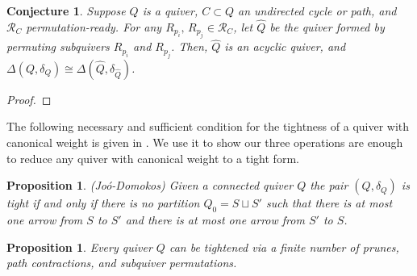 \documentclass[12pt]{amsart}
\theoremstyle{plain}
\newtheorem{conjecture}[theorem]{Conjecture}
\newtheorem{proposition}[theorem]{Proposition}
\theoremstyle{definition}
\begin{document}
\begin{conjecture}
    Suppose $Q$ is a quiver, $C \subset Q$ an undirected cycle or path, and $\mathcal{R}_C$ permutation-ready. For any $R_{p_i},\,R_{p_j} \in \mathcal{R}_C$, let $\hat Q$ be the quiver formed by permuting subquivers $R_{p_i}$ and $R_{p_j}$. Then, $\hat Q$ is an acyclic quiver, and $\Delta(Q, \delta_Q) \cong \Delta(\hat Q, \delta_{\hat Q})$.
\end{conjecture}

\begin{proof}
    
\end{proof}

The following necessary and sufficient condition for the tightness of a quiver with canonical weight is given in \cite{domokos2016equations}. We use it to show our three operations are enough to reduce any quiver with canonical weight to a tight form.

\begin{proposition}\label{canonical-contraction-condition}
    (Joó-Domokos) Given a connected quiver $Q$ the pair $(Q, \delta_Q)$ is tight if and only if there is no partition $Q_0 = S \sqcup S'$ such that there is at most one arrow from $S$ to $S'$ and there is at most one arrow from $S'$ to $S$.
\end{proposition}

\begin{proposition}
    Every quiver $Q$ can be tightened via a finite number of prunes, path contractions, and subquiver permutations.
\end{proposition}
\end{document}
